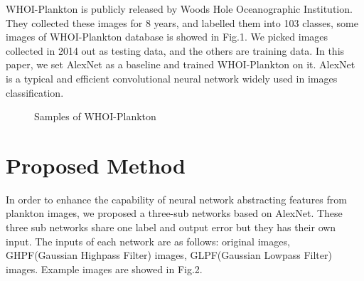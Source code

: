 \documentclass[conference]{IEEEtran}
\begin{document}
WHOI-Plankton is publicly released by Woods Hole Oceanographic Institution\cite{DBLP:journals/corr/OrensteinBPS15}. They collected these images for 8 years, and labelled them into 103 classes, some images of WHOI-Plankton database is showed in Fig.1. We picked images collected in 2014 out as testing data, and the others are training data.  In this paper, we set AlexNet\cite{krizhevsky2012imagenet} as a baseline and trained WHOI-Plankton on it. AlexNet is a typical and efficient convolutional neural network widely used in images classification.

\begin{figure}[!ht]
\centering
{}
  \hspace{0.05in}
  \caption{Samples of WHOI-Plankton}
\end{figure}

\section{Proposed Method}
In order to enhance the capability of neural network\cite{DNN}  abstracting features from plankton images, we proposed a three-sub networks based on AlexNet. These three sub networks  share one label and output error but they has their own input. The inputs of each network are as follows: original images, GHPF(Gaussian Highpass Filter) images, GLPF(Gaussian Lowpass Filter) images. Example images are showed in Fig.2. 
 \newline
 \newline
 
\end{document}
